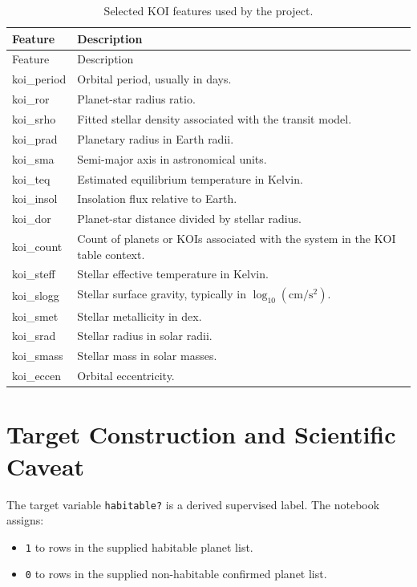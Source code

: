 \documentclass[11pt]{article}
\newcommand{\code}[1]{\texttt{#1}}
\begin{document}
\begin{longtable}{>{\ttfamily}p{}p{}}
\caption{Selected KOI features used by the project.}
\label{tab:features}\\
\toprule
\normalfont Feature & Description \\
\midrule
\endfirsthead
\toprule
\normalfont Feature & Description \\
\midrule
\endhead
koi\_period & Orbital period, usually in days. \\
koi\_ror & Planet-star radius ratio. \\
koi\_srho & Fitted stellar density associated with the transit model. \\
koi\_prad & Planetary radius in Earth radii. \\
koi\_sma & Semi-major axis in astronomical units. \\
koi\_teq & Estimated equilibrium temperature in Kelvin. \\
koi\_insol & Insolation flux relative to Earth. \\
koi\_dor & Planet-star distance divided by stellar radius. \\
koi\_count & Count of planets or KOIs associated with the system in the KOI table context. \\
koi\_steff & Stellar effective temperature in Kelvin. \\
koi\_slogg & Stellar surface gravity, typically in $\log_{10}(\mathrm{cm}/\mathrm{s}^2)$. \\
koi\_smet & Stellar metallicity in dex. \\
koi\_srad & Stellar radius in solar radii. \\
koi\_smass & Stellar mass in solar masses. \\
koi\_eccen & Orbital eccentricity. \\
\bottomrule
\end{longtable}

\section{Target Construction and Scientific Caveat}

The target variable \code{habitable?} is a derived supervised label. The notebook assigns:

\begin{itemize}
  \item \code{1} to rows in the supplied habitable planet list.
  \item \code{0} to rows in the supplied non-habitable confirmed planet list.
\end{itemize}
\end{document}
